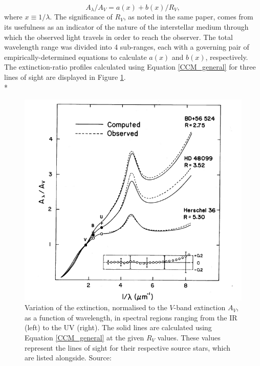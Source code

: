 \documentclass[12pt, a4paper]{report}
\begin{document}
\begin{equation}
A_{\lambda}/A_{V} = a(x) + b(x)/R_{V},
\label{CCM_general}
\end{equation}
where $x \equiv 1/\lambda$. The significance of $R_{V}$, as noted in the same paper, comes from its usefulness as an indicator of the nature of the interstellar medium through which the observed light travels in order to reach the observer. The total wavelength range was divided into 4 sub-ranges, each with a governing pair of empirically-determined equations to calculate $a(x)$ and $b(x)$, respectively. The extinction-ratio profiles calculated using Equation \ref{CCM_general} for three lines of sight are displayed in Figure \ref{cardelli_curve}.\\*

\begin{figure}[h!]
\begin{center}
\includegraphics[width=1.0\textwidth]{cardelli_curve_fig4_crop.png}
\caption{Variation of the extinction, normalised to the $V$-band extinction $A_{V}$, as a function of wavelength, in spectral regions ranging from the IR (left) to the UV (right). The solid lines are calculated using Equation \ref{CCM_general} at the given $R_{V}$ values. These values represent the lines of sight for their respective source stars, which are listed alongside.  Source: \cite{1989ApJ...345..245C}}
\label{cardelli_curve}
\end{center}
\end{figure}
\end{document}
